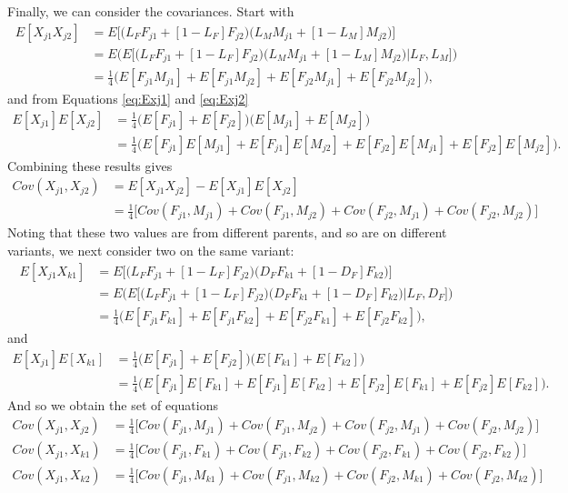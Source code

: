 \documentclass{article}
\begin{document}
Finally, we can consider the covariances. Start with
\begin{align*}
  E[X_{j1} X_{j2}] & = E \Big [ \big ( L_F F_{j1} + [1 - L_F] F_{j2} \big ) \big ( L_M M_{j1} + [1 - L_M] M_{j2} \big ) \Big ] \\
                    & = E \Bigg ( E \Big [ \big ( L_F F_{j1} + [1 - L_F] F_{j2} \big ) \big ( L_M M_{j1} + [1 - L_M] M_{j2} \big ) \Big | L_F, L_M \Big ] \Bigg )\\
  & = \frac{1}{4} \Big ( E[F_{j1} M_{j1}] + E[F_{j1} M_{j2}] + E[F_{j2} M_{j1}] + E[F_{j2} M_{j2}] \Big ),
\end{align*}
and from Equations \ref{eq:Exj1} and \ref{eq:Exj2}
\begin{align*}
  E[X_{j1}] E[X_{j2}] & = \frac{1}{4} \Big ( E[F_{j1}] + E[F_{j2}] \Big ) \Big ( E[M_{j1}] + E[M_{j2}] \Big ) \\
  & = \frac{1}{4} \Big ( E[F_{j1}] E[M_{j1}] + E[F_{j1}] E[M_{j2}] + E[F_{j2}] E[M_{j1}] + E[F_{j2}] E[M_{j2}] \Big ).
\end{align*}
Combining these results gives
\begin{align*}
  Cov(X_{j1}, X_{j2}) & = E[X_{j1} X_{j2}] - E[X_{j1}] E[X_{j2}] \\
                      & = \frac{1}{4} \Big [ Cov(F_{j1}, M_{j1}) + Cov(F_{j1}, M_{j2}) + Cov(F_{j2}, M_{j1}) + Cov(F_{j2}, M_{j2}) \Big ]
\end{align*}
Noting that these two values are from different parents, and so are on different variants, we next consider two on the same variant:
\begin{align*}
  E[X_{j1} X_{k1}] & = E \Big [ \big ( L_F F_{j1} + [1 - L_F] F_{j2} \big ) \big ( D_F F_{k1} + [1 - D_F] F_{k2} \big ) \Big ] \\
                    & = E \Bigg ( E \Big [ \big ( L_F F_{j1} + [1 - L_F] F_{j2} \big ) \big ( D_F F_{k1} + [1 - D_F] F_{k2} \big ) \Big | L_F, D_F \Big ] \Bigg )\\
  & = \frac{1}{4} \Big ( E[F_{j1} F_{k1}] + E[F_{j1} F_{k2}] + E[F_{j2} F_{k1}] + E[F_{j2} F_{k2}] \Big ),
\end{align*}
and
\begin{align*}
  E[X_{j1}] E[X_{k1}] & = \frac{1}{4} \Big ( E[F_{j1}] + E[F_{j2}] \Big ) \Big ( E[F_{k1}] + E[F_{k2}] \Big ) \\
  & = \frac{1}{4} \Big ( E[F_{j1}] E[F_{k1}] + E[F_{j1}] E[F_{k2}] + E[F_{j2}] E[F_{k1}] + E[F_{j2}] E[F_{k2}] \Big ).
\end{align*}
And so we obtain the set of equations
\begin{align}
  Cov(X_{j1}, X_{j2}) & = \frac{1}{4} \Big [ Cov(F_{j1}, M_{j1}) + Cov(F_{j1}, M_{j2}) + Cov(F_{j2}, M_{j1}) + Cov(F_{j2}, M_{j2}) \Big ] \label{eq:covj1j2} \\
  Cov(X_{j1}, X_{k1}) & = \frac{1}{4} \Big [ Cov(F_{j1}, F_{k1}) + Cov(F_{j1}, F_{k2}) + Cov(F_{j2}, F_{k1}) + Cov(F_{j2}, F_{k2}) \Big ] \label{eq:covj1j2} \\
  Cov(X_{j1}, X_{k2}) & = \frac{1}{4} \Big [ Cov(F_{j1}, M_{k1}) + Cov(F_{j1}, M_{k2}) + Cov(F_{j2}, M_{k1}) + Cov(F_{j2}, M_{k2}) \Big ] \label{eq:covj1j2} \\
\end{align}
\end{document}

